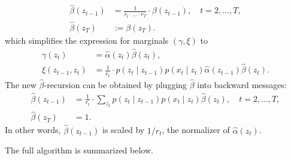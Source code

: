\documentclass[a3paper,12pt]{extarticle} %
\begin{document}
\begin{enumerate}
\begin{enumerate}
    \begin{align}
        \hat{\beta}(z_{t-1}) &= \frac{1}{r_t \cdot \ldots \cdot r_T} \cdot \beta(z_{t-1}), \quad t = 2, \ldots, T, \tag{41} \\
        \hat{\beta}(z_T) &:= \beta(z_T). \tag{42}
    \end{align}
    which simplifies the expression for marginals $(\gamma, \xi)$ to
    \begin{align}
        \gamma(z_t) &= \hat{\alpha}(z_t) \hat{\beta}(z_t), \tag{43} \\
        \xi(z_{t-1}, z_t) &= \frac{1}{r_t} \cdot p(z_t \mid z_{t-1}) p(x_t \mid z_t) \hat{\alpha}(z_{t-1}) \hat{\beta}(z_t). \tag{44}
    \end{align}
    The new $\hat{\beta}$-recursion can be obtained by plugging $\hat{\beta}$ into backward messages:
    \begin{align}
        \hat{\beta}(z_{t-1}) &= \frac{1}{r_t} \cdot \sum_{z_t} p(z_t \mid z_{t-1}) p(x_t \mid z_t) \hat{\beta}(z_t), \quad t = 2, \ldots, T, \tag{45} \\
        \hat{\beta}(z_T) &= 1. \tag{46}
    \end{align}
    In other words, $\hat{\beta}(z_{t-1})$ is scaled by $1/r_t$, the normalizer of $\hat{\alpha}(z_t)$.

    The full algorithm is summarized below.


\end{enumerate}
\end{enumerate}
\end{document}
